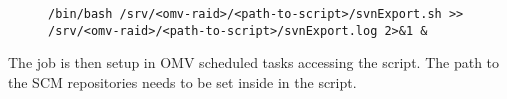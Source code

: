 \begin{figure}[H]
    \scriptsize
    \centering
    \begin{BVerbatim}
/bin/bash /srv/<omv-raid>/<path-to-script>/svnExport.sh >>
/srv/<omv-raid>/<path-to-script>/svnExport.log 2>&1 &
    \end{BVerbatim}
\end{figure}

The job is then setup in \gls{OMV} scheduled tasks accessing the script.
 The path to the \gls{SCM} repositories needs to be set
inside in the script.

